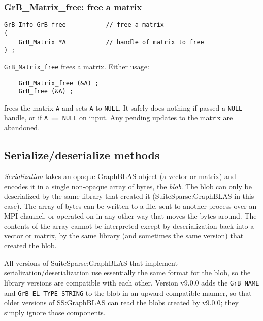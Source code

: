 \documentclass[12pt]{article}
\begin{document}
\subsubsection{{\sf GrB\_Matrix\_free:} free a matrix}
\label{matrix_free}

\begin{mdframed}[userdefinedwidth=6in]
{\footnotesize
\begin{verbatim}
GrB_Info GrB_free           // free a matrix
(
    GrB_Matrix *A           // handle of matrix to free
) ;
\end{verbatim} } \end{mdframed}

\verb'GrB_Matrix_free' frees a matrix.  Either usage:

    {\small
    \begin{verbatim}
    GrB_Matrix_free (&A) ;
    GrB_free (&A) ; \end{verbatim}}

\noindent
frees the matrix \verb'A' and sets \verb'A' to \verb'NULL'.  It safely does
nothing if passed a \verb'NULL' handle, or if \verb'A == NULL' on input.  Any
pending updates to the matrix are abandoned.

\newpage
\subsection{Serialize/deserialize methods}
\label{serialize_deserialize}

{\em Serialization} takes an opaque GraphBLAS object (a vector or matrix) and
encodes it in a single non-opaque array of bytes, the {\em blob}.  The blob can
only be deserialized by the same library that created it (SuiteSparse:GraphBLAS
in this case).  The array of bytes can be written to a file, sent to another
process over an MPI channel, or operated on in any other way that moves the
bytes around.  The contents of the array cannot be interpreted except by
deserialization back into a vector or matrix, by the same library (and
sometimes the same version) that created the blob.

All versions of SuiteSparse:GraphBLAS that implement
serialization/deserialization use essentially the same format for the blob, so
the library versions are compatible with each other.  Version v9.0.0 adds the
\verb'GrB_NAME' and \verb'GrB_EL_TYPE_STRING' to the blob in an upward
compatible manner, so that older versions of SS:GraphBLAS can read the blobs
created by v9.0.0; they simply ignore those components.
\end{document}
